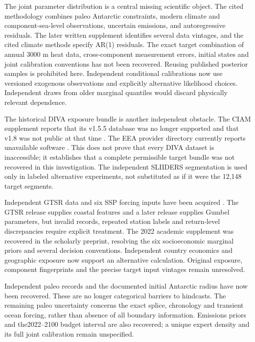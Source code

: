 \documentclass[11pt]{article}
\begin{document}
The joint parameter distribution is a central missing scientific object.
The cited methodology combines paleo Antarctic constraints, modern climate
and component-sea-level observations, uncertain emissions, and autoregressive
residuals. The later written supplement identifies several data vintages, and
the cited climate methods specify AR(1) residuals. The exact target combination
of annual 3000 m heat data, cross-component measurement errors, initial states
and joint calibration conventions has not been recovered. Reusing
published posterior samples is prohibited here. Independent conditional
calibrations now use versioned exogenous observations and explicitly alternative
likelihood choices. Independent draws from older marginal quantiles would
discard physically relevant dependence.

The historical DIVA exposure bundle is another independent obstacle. The CIAM
supplement reports that its v1.5.5 database was no longer supported and that
v1.8 was not public at that time \cite{diaz}. The EEA provider directory currently
reports unavailable software \cite{diva}. This does not prove that every DIVA
dataset is inaccessible; it establishes that a complete permissible target
bundle was not recovered in this investigation. The independent SLIIDERS segmentation is used only in labeled alternative
experiments, not substituted as if it were the 12,148 target segments.

Independent GTSR data and six SSP forcing inputs have been acquired
\cite{gtsr,ssp}. The GTSR release supplies coastal features and a later release
supplies Gumbel parameters, but invalid records, repeated station labels and
return-level discrepancies require explicit treatment. The 2022 academic
supplement was recovered in the scholarly preprint, resolving the six
socioeconomic marginal priors and several decision conventions. Independent country economics and geographic exposure now support an
alternative calculation. Original exposure, component fingerprints and the
precise target input vintages remain unresolved.

Independent paleo records and the documented initial Antarctic radius have now
been recovered. These are no longer categorical barriers to hindcasts.
The remaining paleo uncertainty concerns the exact splice, chronology and
transient ocean forcing, rather than absence of all boundary information.
Emissions priors and the2022--2100 budget interval are also recovered; a unique
expert density and its full joint calibration remain unspecified.
\end{document}
